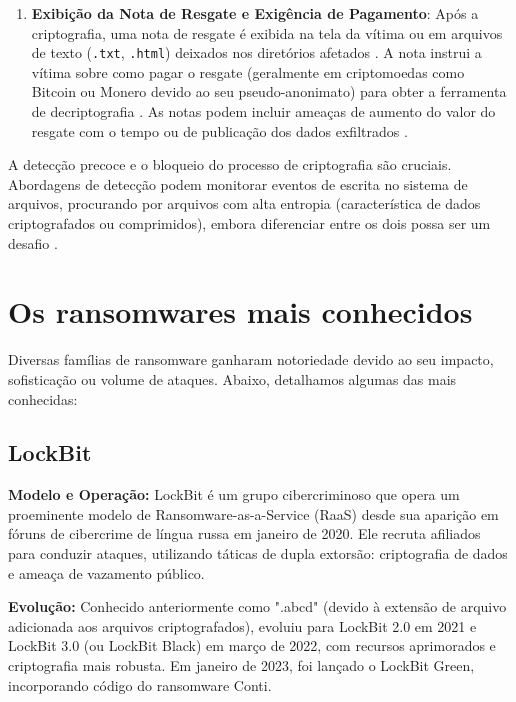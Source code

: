 \begin{enumerate}
    \item \textbf{Exibição da Nota de Resgate e Exigência de Pagamento}: Após a criptografia, uma nota de resgate é 
    exibida na tela da vítima ou em arquivos de texto (\texttt{.txt}, \texttt{.html}) deixados nos diretórios afetados 
    \cite{Muniandy2024Ransomware, WikipediaLockBit}. A nota instrui a vítima sobre como pagar o resgate (geralmente em 
    criptomoedas como Bitcoin ou Monero devido ao seu pseudo-anonimato) para obter a ferramenta de decriptografia 
    \cite{Tanni2022RedAlert, CyberMaxxRansomwareHistory}. As notas podem incluir ameaças de aumento do valor do resgate 
    com o tempo ou de publicação dos dados exfiltrados \cite{WikipediaWannaCry}.
\end{enumerate}

A detecção precoce e o bloqueio do processo de criptografia são cruciais. 
Abordagens de detecção podem monitorar eventos de escrita no sistema de arquivos, 
procurando por arquivos com alta entropia (característica de dados criptografados ou comprimidos), 
embora diferenciar entre os dois possa ser um desafio \cite{Casino2025RansomwareDetection}.

\section{Os ransomwares mais conhecidos}

Diversas famílias de ransomware ganharam notoriedade devido ao seu impacto, sofisticação ou volume de ataques. Abaixo, detalhamos algumas das mais conhecidas:

\subsection{LockBit}
\textbf{Modelo e Operação:} LockBit é um grupo cibercriminoso que opera um proeminente modelo de Ransomware-as-a-Service (RaaS) desde sua aparição em fóruns de cibercrime de língua russa em janeiro de 2020. Ele recruta afiliados para conduzir ataques, utilizando táticas de dupla extorsão: criptografia de dados e ameaça de vazamento público.

\textbf{Evolução:} Conhecido anteriormente como ".abcd" (devido à extensão de arquivo adicionada aos arquivos criptografados), evoluiu para LockBit 2.0 em 2021 e LockBit 3.0 (ou LockBit Black) em março de 2022, com recursos aprimorados e criptografia mais robusta. Em janeiro de 2023, foi lançado o LockBit Green, incorporando código do ransomware Conti.

